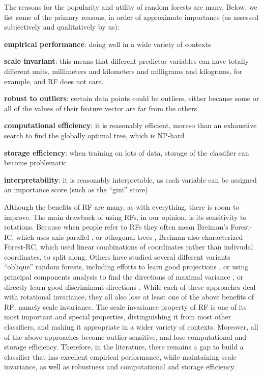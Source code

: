 \documentclass{article} %
\begin{document}
The reasons for the popularity and utility of random forests are many. Below, we list some of the primary reasons, in order of approximate importance (as assessed subjectively and qualitatively by us):
\begin{compactitem}
\item \textbf{empirical performance}: doing well in a wide variety of contexts
\item \textbf{scale invariant}: this means that different predictor variables can have totally different units, millimeters and kilometers and milligrams and kilograms, for example, and RF does not care.
\item \textbf{robust to outliers}: certain data points could be outliers, either because some or all of the values of their feature vector are far from the others
\item \textbf{computational efficiency}: it is reasonably efficient, moreso than an exhaustive search to find the globally optimal tree, which is NP-hard \cite{Heath1993}
\item \textbf{storage efficiency}: when training on lots of data, storage of the classifier can become problematic
\item \textbf{interpretability}: it is reasonably interpretable, as each variable can be assigned an importance score (such as the ``gini'' score)
\end{compactitem}


Although the benefits of RF are many, as with everything, there is room to improve. The main drawback of using RFs, in our opinion, is its sensitivity to rotations.  Because when people refer to RFs they often mean Breiman's Forest-IC, which uses axis-parallel \cite{Heath1993}, or othogonal trees \cite{Menze2011}, Breiman also characterized Forest-RC, which used linear combinations of coordinates rather than indivudal coordinates, to split along.  Others have studied several different variants ``oblique'' random forests, including efforts to learn good projections \cite{Heath1993,Tan2004}, or using principal components analysis to find the directions of maximal variance \cite{Ho1998,Rodriguez2006}, or directly learn good discriminant directions \cite{Menze2011}.  While each of these approaches deal with rotational invariance, they all also lose at least one of the above benefits of RF, namely scale invariance.  The scale invariance property of RF is one of its most important and special properties, distinguishing it from most other classifiers, and making it appropriate in a wider variety of contexts.  
Moreover, all of the above approaches become outlier sensitive, and lose computational and storage efficiency.
Therefore, in the literature, there remains a gap to build a classifier that has excellent empirical performance, while maintaining scale invariance, as well as robustness and computational and storage efficiency.
\end{document}
